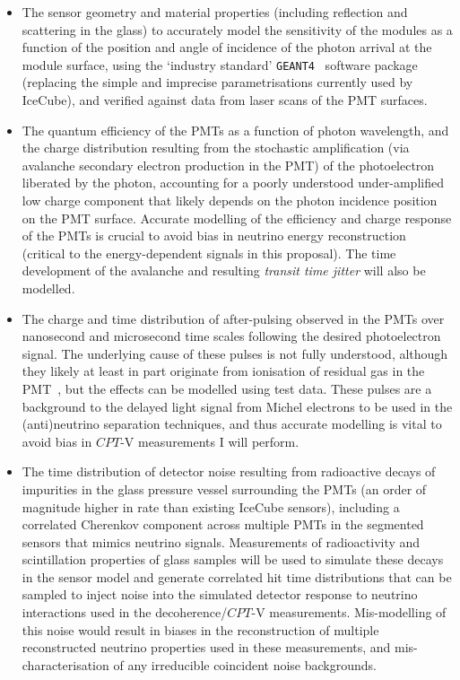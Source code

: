\documentclass[a4paper,11pt]{article}
\begin{document}
\begin{itemize}[leftmargin=*]
    \item The sensor geometry and material properties (including reflection and scattering in the glass) to accurately model the sensitivity of the modules as a function of the position and angle of incidence of the photon arrival at the module surface, using the `industry standard' \texttt{GEANT4}~\cite{Agostinelli:2002hh} software package (replacing the simple and imprecise parametrisations currently used by IceCube), and verified against data from laser scans of the PMT surfaces.
    \item The quantum efficiency of the PMTs as a function of photon wavelength, and the charge distribution resulting from the stochastic amplification (via avalanche secondary electron production in the PMT) of the photoelectron liberated by the photon, accounting for a poorly understood under-amplified low charge component that likely depends on the photon incidence position on the PMT surface. Accurate modelling of the efficiency and charge response of the PMTs is crucial to avoid bias in neutrino energy reconstruction (critical to the energy-dependent signals in this proposal). The time development of the avalanche and resulting \textit{transit time jitter} will also be modelled.
    \item The charge and time distribution of after-pulsing observed in the PMTs over nanosecond and microsecond time scales following the desired photoelectron signal. The underlying cause of these pulses is not fully understood, although they likely at least in part originate from ionisation of residual gas in the PMT~\cite{Ma:2009aw}, but the effects can be modelled using test data. These pulses are a background to the delayed light signal from Michel electrons to be used in the (anti)neutrino separation techniques, and thus accurate modelling is vital to avoid bias in $CPT$-V measurements I will perform. 
    \item The time distribution of detector noise resulting from radioactive decays of impurities in the glass pressure vessel surrounding the PMTs (an order of magnitude higher in rate than existing IceCube sensors), including a correlated Cherenkov component across multiple PMTs in the segmented sensors that mimics neutrino signals. Measurements of radioactivity and scintillation properties of glass samples will be used to simulate these decays in the sensor model and generate correlated hit time distributions that can be sampled to inject noise into the simulated detector response to neutrino interactions used in the decoherence/$CPT$-V measurements. Mis-modelling of this noise would result in biases in the reconstruction of multiple reconstructed neutrino properties used in these measurements, and mis-characterisation of any irreducible coincident noise backgrounds.

\end{itemize}
\end{document}

